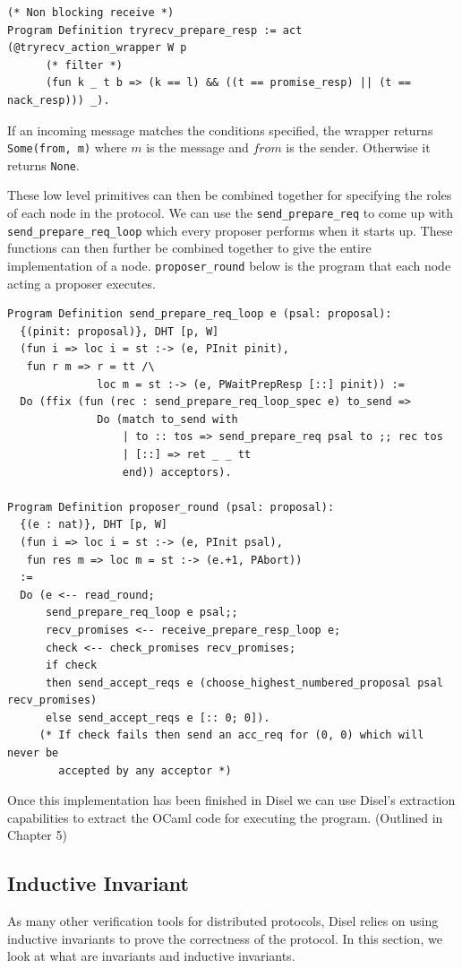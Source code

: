 \begin{lstlisting}
(* Non blocking receive *)
Program Definition tryrecv_prepare_resp := act (@tryrecv_action_wrapper W p
      (* filter *)
      (fun k _ t b => (k == l) && ((t == promise_resp) || (t == nack_resp))) _).
\end{lstlisting}

If an incoming message matches the conditions specified, the wrapper returns
\texttt{Some(from, m)} where $m$ is the message and $from$ is the sender. Otherwise
it returns \texttt{None}.

These low level primitives can then be combined together for specifying the roles
of each node in the protocol. We can use the \texttt{send\_prepare\_req} to
come up with \texttt{send\_prepare\_req\_loop} which every proposer performs when
it starts up. These functions can then further be combined together to give the
entire implementation of a node. \texttt{proposer\_round} below is the program
that each node acting a proposer executes.

\begin{lstlisting}
Program Definition send_prepare_req_loop e (psal: proposal):
  {(pinit: proposal)}, DHT [p, W]
  (fun i => loc i = st :-> (e, PInit pinit),
   fun r m => r = tt /\
              loc m = st :-> (e, PWaitPrepResp [::] pinit)) :=
  Do (ffix (fun (rec : send_prepare_req_loop_spec e) to_send =>
              Do (match to_send with
                  | to :: tos => send_prepare_req psal to ;; rec tos
                  | [::] => ret _ _ tt
                  end)) acceptors).

Program Definition proposer_round (psal: proposal):
  {(e : nat)}, DHT [p, W]
  (fun i => loc i = st :-> (e, PInit psal),
   fun res m => loc m = st :-> (e.+1, PAbort))
  :=
  Do (e <-- read_round;
      send_prepare_req_loop e psal;;
      recv_promises <-- receive_prepare_resp_loop e;
      check <-- check_promises recv_promises;
      if check
      then send_accept_reqs e (choose_highest_numbered_proposal psal recv_promises)
      else send_accept_reqs e [:: 0; 0]).
     (* If check fails then send an acc_req for (0, 0) which will never be
        accepted by any acceptor *)
\end{lstlisting}

Once this implementation has been finished in Disel we can use Disel's extraction
capabilities to extract the OCaml code for executing the program. (Outlined in Chapter 5)

\subsection{Inductive Invariant}
As many other verification tools for distributed protocols, Disel relies on using
inductive invariants to prove the correctness of the protocol. In this section,
we look at what are invariants and inductive invariants.

